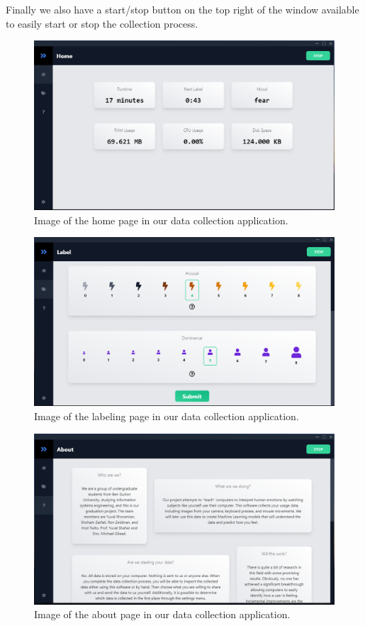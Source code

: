 \documentclass[../main.tex]{subfiles}
\begin{document}
Finally we also have a start/stop button on the top right of the window available to easily start or stop the collection process.

\begin{figure}[htp]
    \centering
    \includegraphics[width=14cm]{figures/ui_home}   
    \caption{Image of the home page in our data collection application.}
    \label{fig:ui_home} 
\end{figure}

\begin{figure}[htp]
    \centering
    \includegraphics[width=14cm]{figures/ui_label}   
    \caption{Image of the labeling page in our data collection application.}
    \label{fig:ui_label} 
\end{figure}

\begin{figure}[htp]
    \centering
    \includegraphics[width=14cm]{figures/ui_about}   
    \caption{Image of the about page in our data collection application.}
    \label{fig:ui_about} 
\end{figure}
\end{document}
